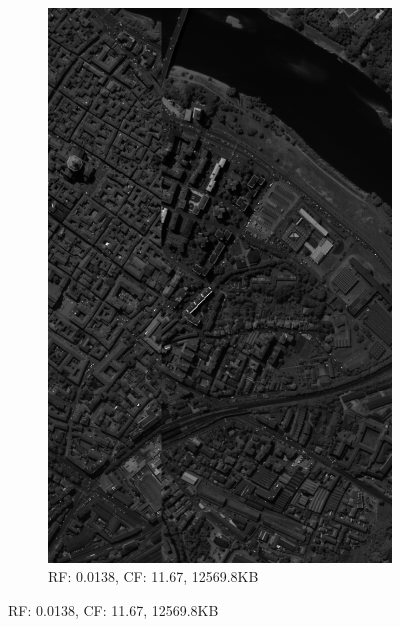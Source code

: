 \begin{figure}[]
\centering
\ContinuedFloat
\begin{subfigure}{\textwidth}
  \centering
  \includegraphics[width=0.85\linewidth]{images/example_compression_Pavia_Centre_0_01.png}
  \caption{RF: 0.0138, CF: 11.67, 12569.8KB}
\end{subfigure}
\end{figure}
